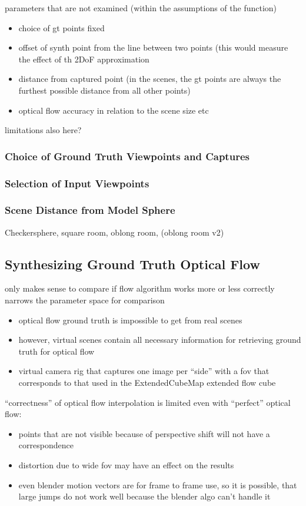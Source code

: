 parameters that are not examined (within the assumptions of the function)
\begin{itemize}
  \item choice of gt points \ar fixed
  \item \ar offset of synth point from the line between two points (this would measure the effect of th 2DoF approximation
  \item distance from captured point (in the scenes, the gt points are always the furthest possible distance from all other points)
  \item optical flow accuracy in relation to the scene size etc
\end{itemize}
limitations also here?

\subsubsection{Choice of Ground Truth Viewpoints and Captures}

\subsubsection{Selection of Input Viewpoints}

\subsubsection{Scene Distance from Model Sphere}
Checkersphere, square room, oblong room, (oblong room v2)

\subsection{Synthesizing Ground Truth Optical Flow}
 only makes sense to compare if flow algorithm works more or less correctly \ar narrows the parameter space for comparison
\begin{itemize}
  \item optical flow ground truth is impossible to get from real scenes
  \item however, virtual scenes contain all necessary information for retrieving ground truth for optical flow
  \item virtual camera rig that captures one image per ``side'' with a fov that corresponds to that used in the ExtendedCubeMap \ar extended flow cube
\end{itemize}

``correctness'' of optical flow interpolation is limited even with ``perfect'' optical flow:
\begin{itemize}
   \item points that are not visible because of perspective shift will not have a correspondence
   \item distortion due to wide fov may have an effect on the results
   \item even blender motion vectors are for frame to frame use, so it is possible, that large jumps do not work well because the blender algo can't handle it
\end{itemize}


